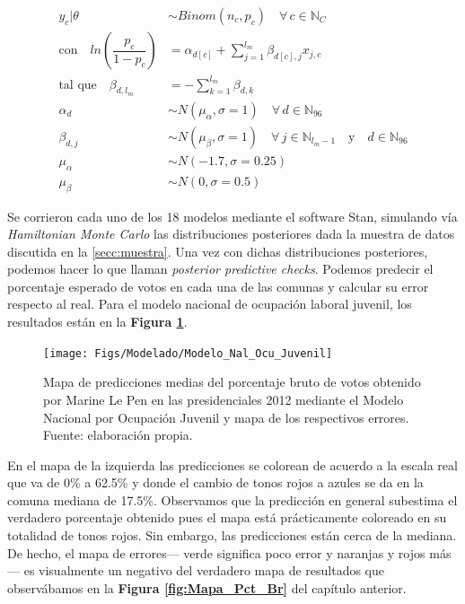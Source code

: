 \begin{align}\label{eq:Modelo_Jer_Ind}
y_c|\theta & \sim Binom(n_c,p_c) \quad \forall \, c \in \mathbb{N}_C \nonumber \\
\text{con} \quad ln\left(\dfrac{p_c}{1-p_c}\right) &= \alpha_{d[c]} + \sum\limits_{j=1}^{l_m} \beta_{d[c],j} x_{j,c} \nonumber\\ 
\text{tal que} \quad \beta_{d,l_m} &= -\sum\limits_{k = 1}^{l_m} \beta_{d,k} \nonumber \\
\alpha_d & \sim N(\mu_{\alpha}, \sigma=1) \quad \forall \, d \in \mathbb{N}_{96} \nonumber \\
\beta_{d,j} & \sim N(\mu_{\beta}, \sigma=1) \quad \forall \, j \in \mathbb{N}_{l_m-1}  \quad \text{y} \quad d \in \mathbb{N}_{96} \nonumber \\
\mu_{\alpha} &\sim N(-1.7,\sigma=0.25) \nonumber \\
\mu_{\beta} &\sim N(0,\sigma=0.5)
\end{align}

Se corrieron cada uno de los 18 modelos mediante el software Stan, simulando vía \textit{Hamiltonian Monte Carlo} las distribuciones posteriores dada la muestra de datos discutida en la \autoref{secc:muestra}. Una vez con dichas distribuciones posteriores, podemos hacer lo que \textcite{Gelman13} llaman \textit{posterior predictive checks}. Podemos predecir el porcentaje esperado de votos en cada una de las comunas y calcular su error respecto al real. Para el modelo nacional de ocupación laboral juvenil, los resultados están en la \textbf{Figura \ref{fig:Modelo_Nal_Ocu_Juvenil}}.\\

\begin{figure}[h]
	\centering
	\texttt{[image: Figs/Modelado/Modelo\_Nal\_Ocu\_Juvenil]}
	\caption{Mapa de predicciones medias del porcentaje bruto de votos obtenido por Marine Le Pen en las presidenciales 2012 mediante el Modelo Nacional por Ocupación Juvenil y mapa de los respectivos errores. Fuente: elaboración propia.}
	\label{fig:Modelo_Nal_Ocu_Juvenil}
\end{figure}

En el mapa de la izquierda las predicciones se colorean de acuerdo a la escala real que va de 0\% a 62.5\% y donde el cambio de tonos rojos a azules se da en la comuna mediana de 17.5\%. Observamos que la predicción en general subestima el verdadero porcentaje obtenido pues el mapa está prácticamente coloreado en su totalidad de tonos rojos. Sin embargo, las predicciones están cerca de la mediana. De hecho, el mapa de errores--- verde significa poco error y naranjas y rojos más--- es visualmente un negativo del verdadero mapa de resultados que observábamos en la \textbf{Figura \ref{fig:Mapa_Pct_Br}} del capítulo anterior.\\

